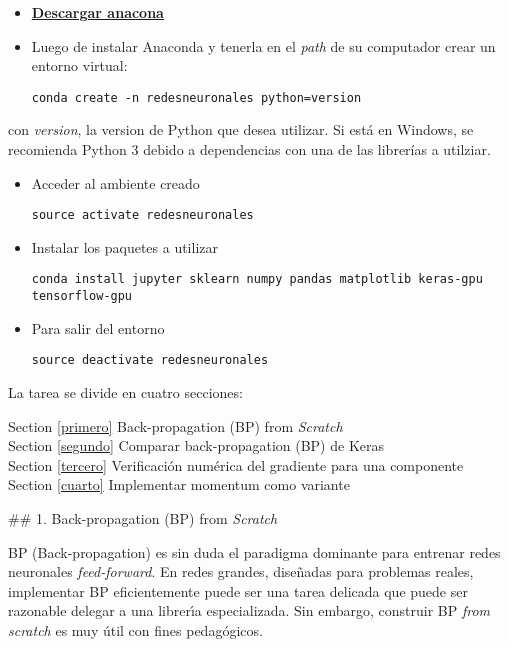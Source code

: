 \documentclass[11pt]{article}
\begin{document}
\begin{itemize}
\item
  \textbf{\href{https://www.anaconda.com/download/\#linux}{Descargar
  anacona}}
\item
  Luego de instalar Anaconda y tenerla en el \emph{path} de su
  computador crear un entorno virtual:

\begin{verbatim}
conda create -n redesneuronales python=version
\end{verbatim}
\end{itemize}

con \emph{version}, la version de Python que desea utilizar. Si está en
Windows, se recomienda Python 3 debido a dependencias con una de las
librerías a utilziar.

\begin{itemize}
\item
  Acceder al ambiente creado

\begin{verbatim}
source activate redesneuronales
\end{verbatim}
\item
  Instalar los paquetes a utilizar

\begin{verbatim}
conda install jupyter sklearn numpy pandas matplotlib keras-gpu tensorflow-gpu 
\end{verbatim}
\item
  Para salir del entorno

\begin{verbatim}
source deactivate redesneuronales
\end{verbatim}
\end{itemize}

La tarea se divide en cuatro secciones:

Section \ref{primero} Back-propagation (BP) from \emph{Scratch}\\
Section \ref{segundo} Comparar back-propagation (BP) de Keras\\
Section \ref{tercero} Verificación numérica del gradiente para una
componente\\
Section \ref{cuarto} Implementar momentum como variante

     \#\# 1. Back-propagation (BP) from \emph{Scratch}

BP (Back-propagation) es sin duda el paradigma dominante para entrenar
redes neuronales \emph{feed-forward}. En redes grandes, diseñadas para
problemas reales, implementar BP eficientemente puede ser una tarea
delicada que puede ser razonable delegar a una librerı́a especializada.
Sin embargo, construir BP \emph{from scratch} es muy útil con fines
pedagógicos.
\end{document}

